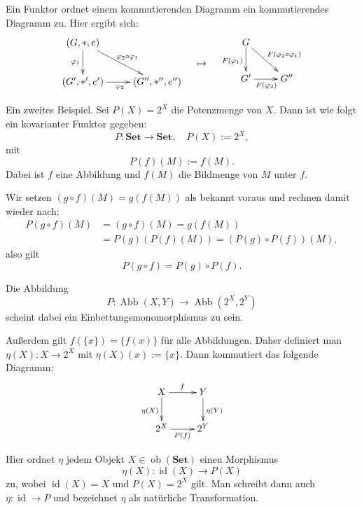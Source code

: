 \documentclass{beamer}
\newcommand{\id}{\operatorname{id}}
\newcommand{\Abb}{\operatorname{Abb}}
\newcommand{\ob}{\operatorname{ob}}
\begin{document}
\begin{frame}
Ein Funktor ordnet einem kommutierenden Diagramm ein
kommutierendes Diagramm zu. Hier ergibt sich:
\[
\begin{matrix}\xymatrix{(G,*,e)\ar[d]_{\varphi_1} \ar[dr]^{\varphi_2\circ\varphi_1}\\
  (G',*',e')\ar[r]_{\varphi_2} & (G'',*'',e'')}\end{matrix}
\quad\mapsto\quad\begin{matrix}
\xymatrix{G\ar[d]_{F(\varphi_1)}\ar[dr]^{F(\varphi_2\circ\varphi_1)}\\
  G'\ar[r]_{F(\varphi_2)} & G''}\end{matrix}
\]
\end{frame}

\begin{frame}
Ein zweites Beispiel. Sei $P(X)=2^X$ die Potenzmenge von $X$.
Dann ist wie folgt ein kovarianter Funktor gegeben:
\[P\colon\mathbf{Set}\to\mathbf{Set},\quad P(X):=2^X,\]
mit
\[P(f)(M) := f(M).\]
Dabei ist $f$ eine Abbildung und $f(M)$ die Bildmenge von $M$
unter $f$.
\end{frame}

\begin{frame}
Wir setzen $(g\circ f)(M)=g(f(M))$ als bekannt voraus und rechnen
damit wieder nach:
\begin{align*}
P(g\circ f)(M) &= (g\circ f)(M) = g(f(M))\\
&= P(g)(P(f)(M)) = (P(g)\circ P(f))(M),
\end{align*}
also gilt
\[P(g\circ f) = P(g)\circ P(f).\]
\end{frame}

\begin{frame}
Die Abbildung
\[P\colon \Abb(X,Y)\to\Abb(2^X,2^Y)\]
scheint dabei ein Einbettungsmonomorphismus zu sein.
\end{frame}

\begin{frame}
Außerdem gilt $f(\{x\})=\{f(x)\}$ für alle Abbildungen. Daher definiert
man $\eta(X)\colon X\to 2^X$ mit $\eta(X)(x):=\{x\}$. Dann
kommutiert das folgende Diagramm:
\[\xymatrix{
X \ar[r]^f \ar[d]_{\eta(X)} & Y \ar[d]^{\eta(Y)} \\
2^X \ar[r]_{P(f)} & 2^Y }\]
\end{frame}

\begin{frame}
Hier ordnet $\eta$ jedem Objekt $X\in\ob(\mathbf{Set})$ einen Morphismus
\[\eta(X)\colon \id(X)\to P(X)\]
zu, wobei $\id(X)=X$ und $P(X)=2^X$ gilt. Man schreibt dann auch
$\eta\colon \id\to P$ und bezeichnet $\eta$ als natürliche
Transformation.
\end{frame}
\end{document}
